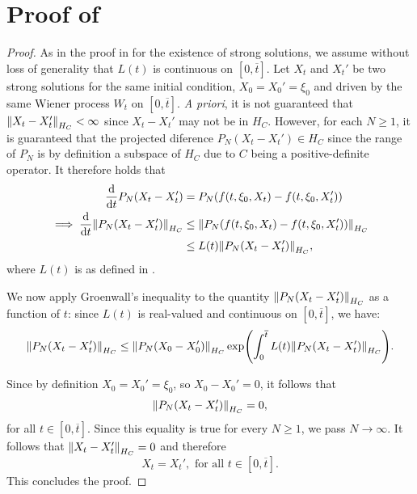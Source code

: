 \section{Proof of } \label{prf:thm:uniq}
\restatethmuniq*

\begin{proof}
  As in the proof in  for the existence of strong solutions, we assume without loss of generality that \(L(t)\) is continuous on \([0, \overline{t}]\). Let \({X}_{t}\) and \({X}_{t}'\) be two strong solutions for the same initial condition, \({X}_{0} = {X}_{0}' = \xi_{0}\) and driven by the same Wiener process \({W}_{t}\) on \([0, {\overline{t}}]\). \textit{A priori}, it is not guaranteed that \(\norm{ {X}_{t} - {X}_{t}'}_{H_{C}} < \infty\) since \({X}_{t} - {X}_{t}'\) may not be in \(H_{C}\). However, for each \(N \geq 1\), it is guaranteed that the projected diference \(P_{N}( {X}_{t} - {X}_{t}') \in H_{C}\) since the range of \(P_{N}\) is by definition a subspace of \(H_{C}\) due to \(C\) being a positive-definite operator. It therefore holds that
  \begin{align*}
    \dv{t}P_{N}\qty({X}_{t} - {X}_{t}') &= P_{N}\qty({f}(t, \xi_{0}, {X}_{t}) - {f}(t, \xi_{0}, {X}_{t}')) \\
    \implies \dv{t} \norm{ P_{N} \qty({X}_{t} - {X}_{t}')}_{H_{C}} &\leq \norm{P_{N}\qty({f}(t, \xi_{0}, {X}_{t}) - {f}(t, \xi_{0}, {X}_{t}'))}_{H_{C}} \\
    &\leq {L}(t)\norm{P_{N}\qty( {X}_{t} - {X}_{t}')}_{H_{C}},
  \end{align*}
  where \({L}(t)\) is as defined in .

  We now apply Groenwall's inequality \citep[][Theorem 1.2.2]{ames1997inequalities} to the quantity \(\norm{P_{N}\qty({X}_{t} - {X}_{t}')}_{H_{C}}\) as a function of \(t\): since \({L}(t)\) is real-valued and continuous on \([0, {\overline{t}}]\), we have:
  \[
    \norm{P_{N}\qty( {X}_{t} - {X}_{t}')}_{H_{C}} \leq \norm{ P_{N}\qty( {X}_{0} - {X}_{0}')}_{H_{C}} \exp(\int_{0}^{ {\overline{t}}} {L}(t) \norm{P_{N}\qty( {X}_{t} - {X}_{t}')}_{H_{C}} ).
  \]

  Since by definition \({X}_{0} = {X}_{0}' = \xi_{0}\), so \({X}_{0} - {X}_{0}' = 0\), it follows that
  \[
    \norm{P_{N}\qty({X}_{t} - {X}_{t}')}_{H_{C}} = 0,
  \]
  for all \(t \in [0, {\overline{t}}]\). Since this equality is true for every \(N \geq 1\), we pass \(N \to \infty\). It follows that \(\norm{ {X}_{t} - {X}_{t}'}_{H_{C}} = 0\) and therefore
  \[
    {X}_{t} = {X}_{t}', \text{ for all } t \in [0, \overline{t}].
  \]
  This concludes the proof.
\end{proof}

